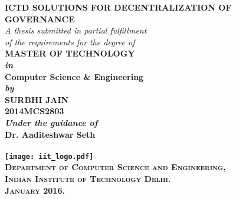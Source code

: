 \begin{titlepage}
\begin{center}

\LARGE{\textsf{\bfseries ICTD SOLUTIONS FOR DECENTRALIZATION OF GOVERNANCE}}\\
\vspace{20pt}
\normalsize
\emph{A thesis submitted in partial fulfillment} \\
\emph{of the requirements for the degree of} \\
\vspace{20pt}
\bfseries MASTER OF TECHNOLOGY \\
\vspace{10pt}
\emph {in}\\
\vspace{10pt}
\bfseries Computer Science \& Engineering \\
\vspace{10pt}
\emph {by}\\
\vspace{10pt}
\Large{\textsf{\bfseries SURBHI JAIN}} \\
{\normalsize \textsf{\bfseries 2014MCS2803}}\\

{\normalsize \emph {Under the guidance of}}
\ \\
\Large{\textsf{\bfseries Dr. Aaditeshwar Seth}} \\
\ \\
\vspace{15pt}
\texttt{[image: iit\_logo.pdf]} \\
\vspace{10pt}
\large{\textsc{Department of Computer Science and Engineering,\\
Indian Institute of Technology Delhi.\\ January 2016.}}
\end{center}
\end{titlepage}
